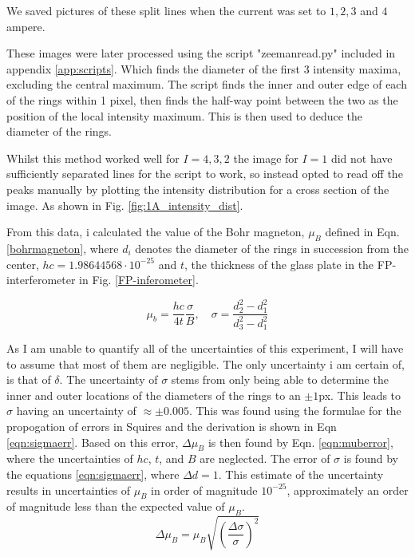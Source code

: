 \documentclass[11pt,a4paper]{article}
\begin{document}
      We saved pictures of these split lines when the current was set to $1, 2, 3$ and $4$ ampere.

      These images were later processed using the script "zeemanread.py" included in appendix \ref{app:scripts}. Which finds the diameter of the first 3 intensity maxima, excluding the central maximum. The script finds the inner and outer edge of each of the rings within 1 pixel, then finds the half-way point between the two as the position of the local intensity maximum. This is then used to deduce the diameter of the rings.

      Whilst this method worked well for $I = 4, 3, 2$ the image for $I=1$ did not have sufficiently separated lines for the script to work, so instead opted to read off the peaks manually by plotting the intensity distribution for a cross section of the image. As shown in Fig. \ref{fig:1A_intensity_dist}.

      From this data, i calculated the value of the Bohr magneton, $\mu_B$ defined in Eqn. \ref{bohrmagneton}, where $d_i$ denotes the diameter of the rings in succession from the center, $hc = 1.98644568\cdot10^{-25}$ and $t$, the thickness of the glass plate in the FP-interferometer in Fig. \ref{FP-inferometer}.

      \begin{equation}
        \mu_b = \frac{hc}{4t} \frac{\sigma}{B},\quad \sigma = \frac{d_2^2 - d_1^2}{d_3^2 - d_1^2}
        \label{bohrmagneton}
      \end{equation}

      As I am unable to quantify all of the uncertainties of this experiment, I will have to assume that most of them are negligible. The only uncertainty i am certain of, is that of $\delta$. The uncertainty of $\sigma$ stems from only being able to determine the inner and outer locations of the diameters of the rings to an $\pm 1$px. This leads to $\sigma$ having an uncertainty of $\approx\pm 0.005$. This was found using the formulae for the propogation of errors in Squires\cite{squires_practical_2001} and the derivation is shown in Eqn \ref{eqn:sigmaerr}. Based on this error, $\Delta \mu_B$ is then found by Eqn. \ref{eqn:muberror}, where the uncertainties of $hc$, $t$, and $B$ are neglected. The error of $\sigma$ is found by the equations \ref{eqn:sigmaerr}, where $\Delta d =1$. This estimate of the uncertainty results in uncertainties of $\mu_B$ in order of magnitude $10^{-25}$, approximately an order of magnitude less than the expected value of $\mu_B$.
      \begin{equation}
        \Delta \mu_B = \mu_B \sqrt{\left(\frac{\Delta \sigma}{\sigma}\right)^2}
        \label{eqn:muberror}
      \end{equation}
\end{document}
